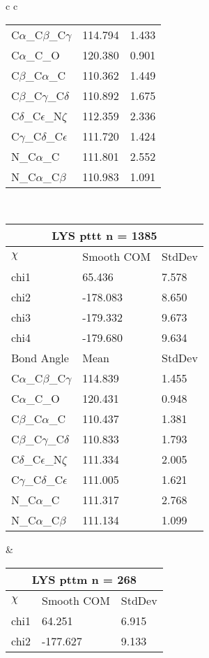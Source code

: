 \begin{longtable}{ c c }
\begin{tabular}{ l l l }
  C$\alpha$\_C$\beta$\_C$\gamma$ & 114.794 & 1.433\\
  C$\alpha$\_C\_O & 120.380 & 0.901\\
  C$\beta$\_C$\alpha$\_C & 110.362 & 1.449\\
  C$\beta$\_C$\gamma$\_C$\delta$ & 110.892 & 1.675\\
  C$\delta$\_C$\epsilon$\_N$\zeta$ & 112.359 & 2.336\\
  C$\gamma$\_C$\delta$\_C$\epsilon$ & 111.720 & 1.424\\
  N\_C$\alpha$\_C & 111.801 & 2.552\\
  N\_C$\alpha$\_C$\beta$ & 110.983 & 1.091\\
  \bottomrule
  \end{tabular}
  \\
  \begin{tabular}{ l l l }
  \toprule
  \multicolumn{3}{c}{LYS \textbf{pttt} n = 1385} \\ \toprule
  $\chi$       & Smooth COM & StdDev \\ \midrule
  chi1 & 65.436 & 7.578 \\ 
  chi2 & -178.083 & 8.650 \\ 
  chi3 & -179.332 & 9.673 \\ 
  chi4 & -179.680 & 9.634 \\ \midrule
  Bond Angle   & Mean     & StdDev \\ \midrule
  C$\alpha$\_C$\beta$\_C$\gamma$ & 114.839 & 1.455\\
  C$\alpha$\_C\_O & 120.431 & 0.948\\
  C$\beta$\_C$\alpha$\_C & 110.437 & 1.381\\
  C$\beta$\_C$\gamma$\_C$\delta$ & 110.833 & 1.793\\
  C$\delta$\_C$\epsilon$\_N$\zeta$ & 111.334 & 2.005\\
  C$\gamma$\_C$\delta$\_C$\epsilon$ & 111.005 & 1.621\\
  N\_C$\alpha$\_C & 111.317 & 2.768\\
  N\_C$\alpha$\_C$\beta$ & 111.134 & 1.099\\
  \bottomrule
  \end{tabular}
  &
  \begin{tabular}{ l l l }
  \toprule
  \multicolumn{3}{c}{LYS \textbf{pttm} n = 268} \\ \toprule
  $\chi$       & Smooth COM & StdDev \\ \midrule
  chi1 & 64.251 & 6.915 \\ 
  chi2 & -177.627 & 9.133 \\ 

\end{tabular}
\end{longtable}
